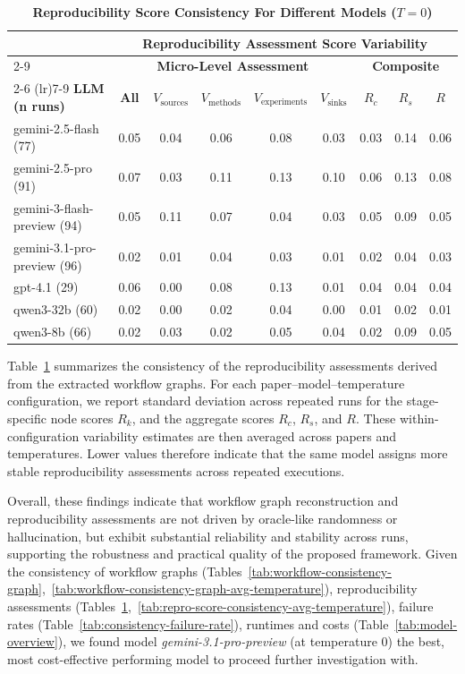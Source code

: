 \documentclass{article}
\begin{document}
\begin{table}[!ht]
\centering
\caption{\textbf{Reproducibility Score Consistency For Different Models ($T=0$)}}
\label{tab:repro-score-consistency}
\begin{tabular}{lcccccccc}
\toprule
& \multicolumn{8}{c}{\textbf{Reproducibility Assessment Score Variability}} \\
\cmidrule(lr){2-9}
& \multicolumn{5}{c}{\textbf{Micro-Level Assessment}} 
& \multicolumn{3}{c}{\textbf{Composite}} \\
\cmidrule(lr){2-6} \cmidrule(lr){7-9}
\textbf{LLM (n runs)} 
& \textbf{All} 
& {$V_{\text{sources}}$} 
& {$V_{\text{methods}}$} 
& {$V_{\text{experiments}}$} 
& {$V_{\text{sinks}}$} 
& {$R_c$} 
& {$R_s$} 
& {$R$} \\
\midrule
gemini-2.5-flash (77)       & 0.05 & 0.04 & 0.06 & 0.08 & 0.03 & 0.03 & 0.14 & 0.06 \\
gemini-2.5-pro (91)         & 0.07 & 0.03 & 0.11 & 0.13 & 0.10 & 0.06 & 0.13 & 0.08 \\
gemini-3-flash-preview (94) & 0.05 & 0.11 & 0.07 & 0.04 & 0.03 & 0.05 & 0.09 & 0.05 \\
gemini-3.1-pro-preview (96) & 0.02 & 0.01 & 0.04 & 0.03 & 0.01 & 0.02 & 0.04 & 0.03 \\
gpt-4.1 (29)                & 0.06 & 0.00 & 0.08 & 0.13 & 0.01 & 0.04 & 0.04 & 0.04 \\
qwen3-32b (60)              & 0.02 & 0.00 & 0.02 & 0.04 & 0.00 & 0.01 & 0.02 & 0.01 \\
qwen3-8b (66)               & 0.02 & 0.03 & 0.02 & 0.05 & 0.04 & 0.02 & 0.09 & 0.05 \\
\bottomrule
\end{tabular}
\end{table}

Table~\ref{tab:repro-score-consistency} summarizes the consistency of the reproducibility assessments derived from the extracted workflow graphs.
For each paper--model--temperature configuration, we report standard deviation across repeated runs for the stage-specific node scores $R_k$, and the aggregate scores $R_c$, $R_s$, and $R$.
These within-configuration variability estimates are then averaged across papers and temperatures.
Lower values therefore indicate that the same model assigns more stable reproducibility assessments across repeated executions.

Overall, these findings indicate that workflow graph reconstruction and reproducibility assessments are not driven by oracle-like randomness or hallucination, but exhibit substantial reliability and stability across runs, supporting the robustness and practical quality of the proposed framework.
%
Given the consistency of workflow graphs (Tables~\ref{tab:workflow-consistency-graph},~\ref{tab:workflow-consistency-graph-avg-temperature}), reproducibility assessments (Tables~\ref{tab:repro-score-consistency},~\ref{tab:repro-score-consistency-avg-temperature}), failure rates (Table~\ref{tab:consistency-failure-rate}), runtimes and costs (Table~\ref{tab:model-overview}), we found model \textit{gemini-3.1-pro-preview} (at temperature 0) the best, most cost-effective performing model to proceed further investigation with.
\end{document}
